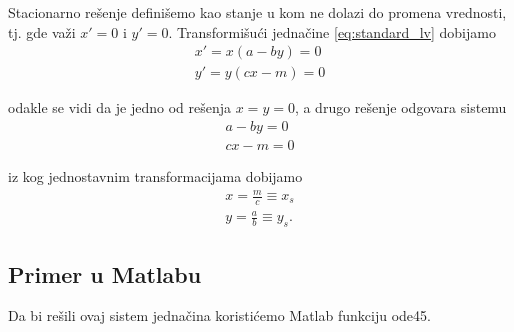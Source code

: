 \documentclass[a4paper]{article}
\begin{document}
Stacionarno rešenje definišemo kao stanje u kom ne dolazi do promena vrednosti, tj.
gde važi $x' = 0$ i $y' = 0$.
Transformišući jednačine \eqref{eq:standard_lv} dobijamo
    \begin{displaymath}
        \begin{aligned}
            x' = x (a - by) = 0\\
            y' = y (cx - m) = 0
        \end{aligned}
    \end{displaymath}

odakle se vidi da je jedno od rešenja $x = y = 0$,
a drugo rešenje odgovara sistemu
    \begin{displaymath}
        \begin{aligned}
            a - by = 0\\
            cx - m = 0
        \end{aligned}
    \end{displaymath}

iz kog jednostavnim transformacijama dobijamo
    \begin{equation}
        \label{eq:stac_sol_std}
        \begin{aligned}
            x = \frac{m}{c} \equiv x_s\\
            y = \frac{a}{b} \equiv y_s.
        \end{aligned}
    \end{equation}

\subsection{Primer u Matlabu}
\label{sub:std_primer}
Da bi rešili ovaj sistem jednačina koristićemo Matlab funkciju ode45.


\end{document}
